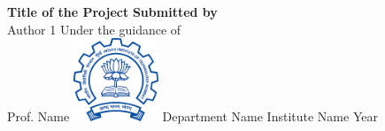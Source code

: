 \documentclass{article}
\begin{document}
	\begin{titlepage}
        \begin{center}
            \huge
            \textbf{Title of the Project}
            \vfill
            \Large
            \textbf{Submitted by} \\
            \medskip
            Author 1
            \vfill
            Under the guidance of \\
            \medskip
            Prof. Name
            \vfill
            \includegraphics[width=1in]{iit}
            \vfill
            Department Name
            \vfill
            Institute Name
            \vfill
            Year
        \end{center}
    \end{titlepage}
\end{document}
